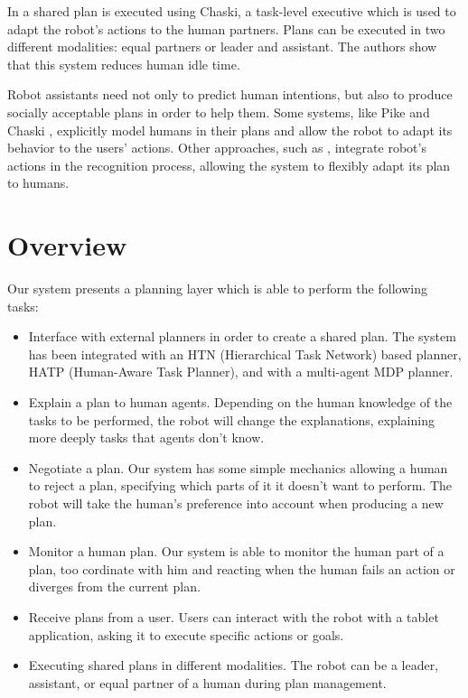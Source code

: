 In \cite{shah2011improved} a shared plan is executed
using Chaski, a task-level executive which is used to adapt the robot's actions to
the human partners. Plans can be executed in two different modalities:
equal partners or leader and assistant. The authors show that this
system reduces human idle time.


Robot assistants need not only to predict human intentions, but also to produce socially acceptable plans in order to help them. Some systems, like Pike \cite{karpas2015robust} and Chaski \cite{shah2011improved}, explicitly model humans in their plans and allow the robot to adapt its behavior to the users' actions.  Other approaches, such as \cite{levine2014concurrent}, integrate robot's actions in the recognition process, allowing the system to flexibly adapt its plan to humans. 


\section{Overview}
Our system presents a planning layer which is able to perform the following tasks:
\begin{itemize}
	\item Interface with external planners in order to create a shared plan. The system has been integrated with an HTN (Hierarchical Task Network) based planner, HATP (Human-Aware Task Planner), and with a multi-agent MDP planner.
	\item Explain a plan to human agents. Depending on the human knowledge of the tasks to be performed, the robot will change the explanations, explaining more deeply tasks that agents don't know.
	\item Negotiate a plan. Our system has some simple mechanics allowing a human to reject a plan, specifying which parts of it it doesn't want to perform. The robot will take the human's preference into account when producing a new plan.
	\item Monitor a human plan. Our system is able to monitor the human part of a plan, too cordinate with him and reacting when the human fails an action or diverges from the current plan.
	\item Receive plans from a user. Users can interact with the robot with a tablet application, asking it to execute specific actions or goals.
	\item Executing shared plans in different modalities. The robot can be a leader, assistant, or equal partner of a human during plan management.
\end{itemize}

